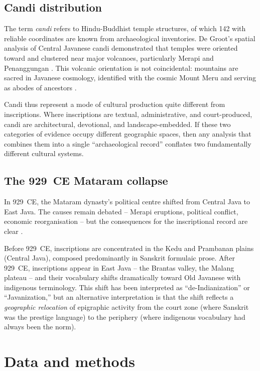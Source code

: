 \documentclass[12pt]{article}
\begin{document}
\subsection{Candi distribution}

The term \textit{candi} refers to Hindu-Buddhist temple structures, of which 142 with reliable coordinates are known from archaeological inventories.
De Groot's spatial analysis of Central Javanese candi demonstrated that temples were oriented toward and clustered near major volcanoes, particularly Merapi and Penanggungan \citep{Degroot2009}.
This volcanic orientation is not coincidental: mountains are sacred in Javanese cosmology, identified with the cosmic Mount Meru and serving as abodes of ancestors \citep{Dumarcay1986, Kinney2003}.

Candi thus represent a mode of cultural production quite different from inscriptions.
Where inscriptions are textual, administrative, and court-produced, candi are architectural, devotional, and landscape-embedded.
If these two categories of evidence occupy different geographic spaces, then any analysis that combines them into a single ``archaeological record'' conflates two fundamentally different cultural systems.

\subsection{The 929~CE Mataram collapse}

In 929~CE, the Mataram dynasty's political centre shifted from Central Java to East Java.
The causes remain debated -- Merapi eruptions, political conflict, economic reorganisation -- but the consequences for the inscriptional record are clear \citep{Christie1991, Hall2011}.

Before 929~CE, inscriptions are concentrated in the Kedu and Prambanan plains (Central Java), composed predominantly in Sanskrit formulaic prose.
After 929~CE, inscriptions appear in East Java -- the Brantas valley, the Malang plateau -- and their vocabulary shifts dramatically toward Old Javanese with indigenous terminology.
This shift has been interpreted as ``de-Indianization'' or ``Javanization,'' but an alternative interpretation is that the shift reflects a \emph{geographic relocation} of epigraphic activity from the court zone (where Sanskrit was the prestige language) to the periphery (where indigenous vocabulary had always been the norm).


\section{Data and methods}
\end{document}
